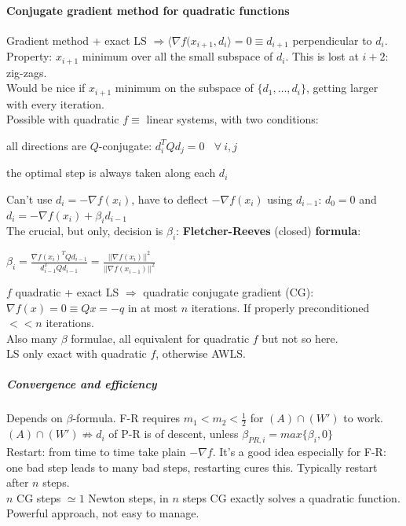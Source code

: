 \documentclass[10pt]{report}
\begin{document}
\paragraph{Conjugate gradient method for quadratic functions} Gradient method + exact LS $\Rightarrow \langle \nabla f(x_{i+1}, d_i\rangle = 0\equiv d_{i+1}$ perpendicular to $d_i$. Property: $x_{i+1}$ minimum over all the small subspace of $d_i$. This is lost at $i+2$: zig-zags.\\
Would be nice if $x_{i+1}$ minimum on the subspace of $\{d_1,\ldots,d_i\}$, getting larger with every iteration.\\
Possible with quadratic $f\equiv$ linear systems, with two conditions:
\begin{list}{}{}
	\item all directions are $Q$-conjugate: $d_i^TQd_j=0\:\:\:\:\forall\:i,j$
	\item the optimal step is always taken along each $d_i$
\end{list}
Can't use $d_i = -\nabla f(x_i)$, have to deflect $-\nabla f(x_i)$ using $d_{i-1}$: $d_0 = 0$ and $d_i = -\nabla f(x_i) + \beta_id_{i-1}$\\
The crucial, but only, decision is $\beta_i$: \textbf{Fletcher-Reeves} (closed) \textbf{formula}:
\begin{list}{}{}
	\item $\beta_i = \frac{\nabla f(x_i)^T Qd_{i-1}}{d_{i-1}^TQd_{i-1}} = \frac{||\nabla f(x_i)||^2}{||\nabla f(x_{i-1})||^2}$
\end{list}
$f$ quadratic + exact LS $\Rightarrow$ quadratic conjugate gradient (CG): $\nabla f(x) = 0 \equiv Qx = -q$ in at most $n$ iterations. If properly preconditioned $<< n$ iterations.\\
Also many $\beta$ formulae, all equivalent for quadratic $f$ but not so here.\\
LS only exact with quadratic $f$, otherwise AWLS.
\subparagraph{Convergence and efficiency} Depends on $\beta$-formula. F-R requires $m_1<m_2<\frac{1}{2}$ for $(A)\cap(W')$ to work.\\
$(A)\cap(W')\not\Rightarrow d_i$ of P-R is of descent, unless $\beta_{PR,i} = max\{\beta_i, 0\}$\\
Restart: from time to time take plain $-\nabla f$. It's a good idea especially for F-R: one bad step leads to many bad steps, restarting cures this. Typically restart after $n$ steps.\\
$n$ CG steps $\simeq 1$ Newton steps, in $n$ steps CG exactly solves a quadratic function. Powerful approach, not easy to manage.
\end{document}
